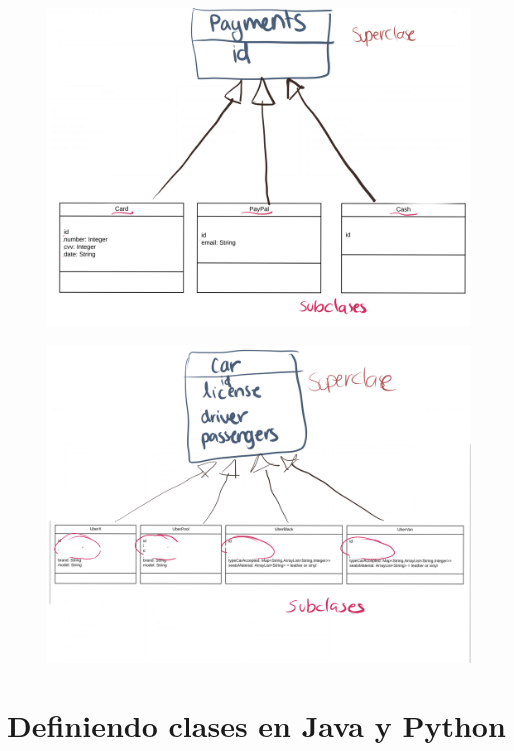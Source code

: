 \documentclass{article}
\begin{document}
\begin{figure}[h!]
  \centering
  \includegraphics[scale=0.08]{./Pictures/015_herencia_proyecto_uber1.png}
\end{figure}

\begin{figure}[h!]
  \centering
  \includegraphics[scale=0.08]{./Pictures/016_herencia_proyecto_uber3.png}
\end{figure}


\newpage
\section{Definiendo clases en Java y Python}%
\end{document}
